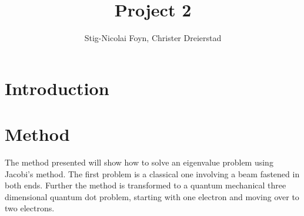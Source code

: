 \documentclass{emulateapj}
\begin{document}
\title{Project 2}

\author{Stig-Nicolai Foyn, Christer Dreierstad}




\begin{abstract}
\end{abstract}

\section{Introduction}
\label{sec:introduction}



\section{Method}
\label{sec:method}
The method presented will show how to solve an eigenvalue problem using Jacobi's method. The first problem is a classical one involving a beam fastened in both ends. Further the method is transformed to a quantum mechanical three dimensional quantum dot problem, starting with one electron and moving over to two electrons.
\end{document}
